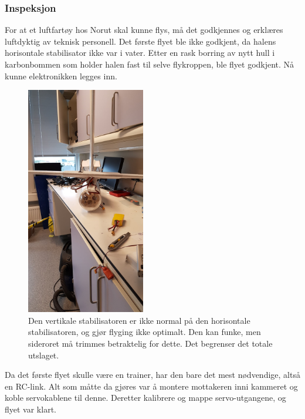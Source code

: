 \documentclass[12pt, a4paper]{article}
\begin{document}
\subsubsection{Inspeksjon}
For at et luftfartøy hos Norut skal kunne flys, må det godkjennes og erklæres luftdyktig av teknisk personell. Det første flyet ble ikke godkjent, da halens horisontale stabilisator ikke var i vater. Etter en rask borring av nytt hull i karbonbommen som holder halen fast til selve flykroppen, ble flyet godkjent. Nå kunne elektronikken legges inn. \\

\begin{figure}[ht]
	\centering
	\includegraphics[width = .5\textwidth, height = 10cm]{bilder/skjev_halefinne.jpg}
	\caption[Skjev stabilisator]{Den vertikale stabilisatoren er ikke normal på den horisontale stabilisatoren, og gjør flyging ikke optimalt. Den kan funke, men sideroret må trimmes betraktelig for dette. Det begrenser det totale utslaget.}
\end{figure}

Da det første flyet skulle være en trainer, har den bare det mest nødvendige, altså en RC-link. Alt som måtte da gjøres var å montere mottakeren inni kammeret og koble servokablene til denne. Deretter kalibrere og mappe servo-utgangene, og flyet var klart.
\end{document}

